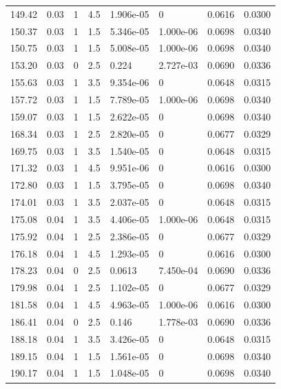 \documentclass[preview]{standalone}
\begin{document}
{{{\begin{tabular}{L{1.2cm}C{1.2cm} C{0.3cm}C{0.5cm} C{1.4cm}C{1.4cm} C{1.4cm}C{1.4cm}}
  149.42  &  0.03  & 1     & 4.5 &  1.906e-05  & 0  & 0.0616 &  0.0300   \\ 
  150.37  &  0.03  & 1     & 1.5 &  5.346e-05  & 1.000e-06  & 0.0698 &  0.0340   \\ 
  150.75  &  0.03  & 1     & 1.5 &  5.008e-05  & 1.000e-06  & 0.0698 &  0.0340   \\ 
  153.20  &  0.03  & 0     & 2.5 &  0.224  & 2.727e-03  & 0.0690 &  0.0336   \\ 
  155.63  &  0.03  & 1     & 3.5 &  9.354e-06  & 0  & 0.0648 &  0.0315   \\ 
  157.72  &  0.03  & 1     & 1.5 &  7.789e-05  & 1.000e-06  & 0.0698 &  0.0340   \\ 
  159.07  &  0.03  & 1     & 1.5 &  2.622e-05  & 0  & 0.0698 &  0.0340   \\ 
  168.34  &  0.03  & 1     & 2.5 &  2.820e-05  & 0  & 0.0677 &  0.0329   \\ 
  169.75  &  0.03  & 1     & 3.5 &  1.540e-05  & 0  & 0.0648 &  0.0315   \\ 
  171.32  &  0.03  & 1     & 4.5 &  9.951e-06  & 0  & 0.0616 &  0.0300   \\ 
  172.80  &  0.03  & 1     & 1.5 &  3.795e-05  & 0  & 0.0698 &  0.0340   \\ 
  174.01  &  0.03  & 1     & 3.5 &  2.037e-05  & 0  & 0.0648 &  0.0315   \\ 
  175.08  &  0.04  & 1     & 3.5 &  4.406e-05  & 1.000e-06  & 0.0648 &  0.0315   \\ 
  175.92  &  0.04  & 1     & 2.5 &  2.386e-05  & 0  & 0.0677 &  0.0329   \\ 
  176.18  &  0.04  & 1     & 4.5 &  1.293e-05  & 0  & 0.0616 &  0.0300   \\ 
  178.23  &  0.04  & 0     & 2.5 &  0.0613  & 7.450e-04  & 0.0690 &  0.0336   \\ 
  179.98  &  0.04  & 1     & 2.5 &  1.102e-05  & 0  & 0.0677 &  0.0329   \\ 
  181.58  &  0.04  & 1     & 4.5 &  4.963e-05  & 1.000e-06  & 0.0616 &  0.0300   \\ 
  186.41  &  0.04  & 0     & 2.5 &  0.146  & 1.778e-03  & 0.0690 &  0.0336   \\ 
  188.18  &  0.04  & 1     & 3.5 &  3.426e-05  & 0  & 0.0648 &  0.0315   \\ 
  189.15  &  0.04  & 1     & 1.5 &  1.561e-05  & 0  & 0.0698 &  0.0340   \\ 
  190.17  &  0.04  & 1     & 1.5 &  1.048e-05  & 0  & 0.0698 &  0.0340   \\ 

\end{tabular}}}}
\end{document}
